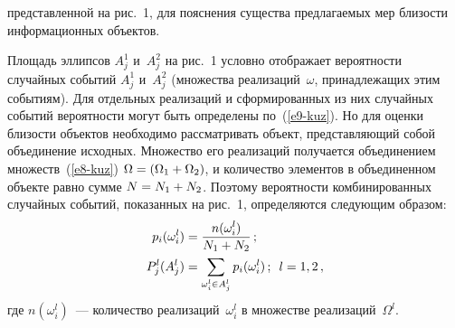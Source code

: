 \begin{multicols}{2}
\vspace*{12pt}

\addtocounter{figure}{1}


\noindent
 представленной на рис.~1, для пояснения существа
предлагаемых мер близости информационных объектов.


  Площадь эллипсов $A_j^1$ и~$A_j^2$ на рис.~1 условно отображает
вероятности случайных событий $A_j^1$ и~$A_j^2$ (множества
реализаций~$\omega$, принадлежащих этим событиям). Для отдельных
реализаций и сформированных из них случайных событий вероятности могут
быть определены по~(\ref{e9-kuz}). Но для оценки близости объектов
необходимо рассматривать объект, представляющий собой объединение
исходных. Множество его реализаций получается объединением
множеств~(\ref{e8-kuz}) $\Omega\hm=
(\Omega_1\hm+\Omega_2)$, и количество элементов в объединенном объекте
равно сумме $N\hm = N_1 \hm+ N_2$. Поэтому вероятности комбинированных
случайных событий, показанных на рис.~1, определяются следующим образом:
  \begin{align*}
  p_i(\omega_i^l)& =\displaystyle\frac{\displaystyle n(\omega_i^l)\mathstrut}{\displaystyle N_1+N_2\mathstrut}\,;\\
  P_j^l(A_j^l) &=\sum\limits_{\omega_i^l\in A_j^l} p_i(\omega_i^l)\,;\enskip l=1,2\,,
\end{align*}
где $n(\omega_i^l)$~--- количество реализаций~$\omega_i^l$ в множестве
реализаций~$\Omega^l$.


\end{multicols}
